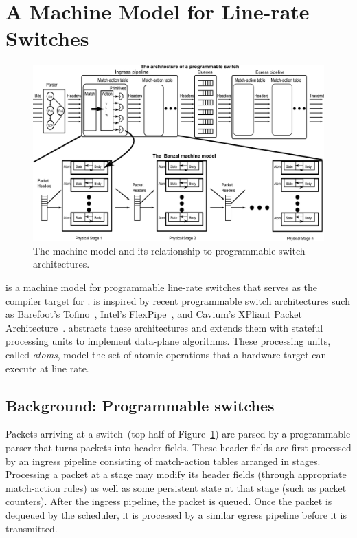 \section{A Machine Model for Line-rate Switches}
\label{s:absmachine}

\begin{figure}[!t]
  \includegraphics[width=\textwidth]{banzai.pdf}
  \caption{The \absmachine machine model and its relationship to
  programmable switch architectures.}
  \label{fig:switch}
\end{figure}

\absmachine is a machine model for programmable line-rate switches that serves
as the compiler target for \pktlanguage.  \absmachine is inspired by recent
programmable switch architectures such as Barefoot's Tofino~\cite{tofino},
Intel's FlexPipe~\cite{flexpipe}, and Cavium's XPliant Packet
Architecture~\cite{xpliant}. \absmachine abstracts these architectures and
extends them with stateful processing units to implement data-plane algorithms.
These processing units, called {\em atoms}, model the set of atomic operations
that a hardware target can execute at line rate.

\subsection{Background: Programmable switches}
Packets arriving at a switch~(top half of Figure~\ref{fig:switch}) are parsed
by a programmable parser that turns packets into header fields. These header
fields are first processed by an ingress pipeline consisting of match-action
tables arranged in stages. Processing a packet at a stage may modify its header
fields (through appropriate match-action rules) as well as some persistent
state at that stage (such as packet counters). After the ingress pipeline, the
packet is queued. Once the packet is dequeued by the scheduler, it is processed
by a similar egress pipeline before it is transmitted.

